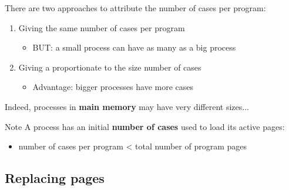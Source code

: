 \documentclass{beamer}[10pt, usepdftitle=false, handout]
\begin{document}
	\begin{frame}
	
	There are two approaches to attribute the number of cases per program:
	\vspace*{1em}
	\begin{enumerate}
	\item{Giving the same number of cases per program
	\begin{itemize}
	\item{BUT: a small process can have as many as a big process}
	\end{itemize}
	}
	\item{Giving a proportionate to the size number of cases
	\begin{itemize}
	\item{Advantage: bigger processes have more cases}
	\end{itemize}		
	}
	\end{enumerate}
		
	\vspace*{1em}		
		
	Indeed, processes in \textbf{main memory} may have very different sizes...	
	
	\vspace*{1em}
	
	\begin{block}{Note}
	A process has an initial \textbf{number of cases} used to load its active pages:
	\begin{itemize}
	\item{number of cases per program < total number of program pages}
	\end{itemize}
	\end{block}
	
	
	\end{frame}	
	
	\subsection{Replacing pages}	
	
\end{document}

